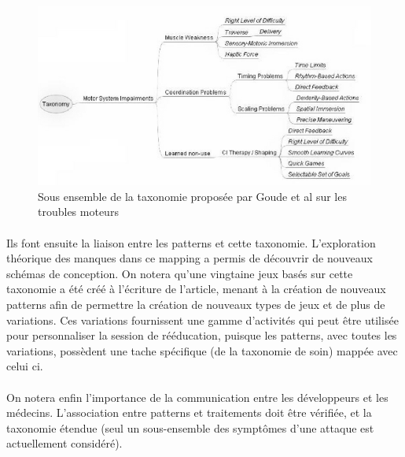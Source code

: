 \begin{figure}
	\centering
	\includegraphics[width=15cm]{images/taxonomy_conception.png}
	\caption{Sous ensemble de la taxonomie proposée par Goude et al\cite{Goud07} sur les troubles moteurs}
	\label{taxonomy_conception}
\end{figure}

\paragraph{}Ils font ensuite la liaison entre les patterns et cette taxonomie. L'exploration théorique des manques dans ce mapping a permis de découvrir de nouveaux schémas de conception. On notera qu'une vingtaine jeux basés sur cette taxonomie a été créé à l'écriture de l'article, menant à la création de nouveaux patterns afin de permettre la création de nouveaux types de jeux et de plus de variations. Ces variations fournissent une gamme d'activités qui peut être utilisée pour personnaliser la session de rééducation, puisque les patterns, avec toutes les variations, possèdent une tache spécifique (de la taxonomie de soin) mappée avec celui ci.

\paragraph{}On notera enfin l'importance de la communication entre les développeurs et les médecins. L'association entre patterns et traitements doit être vérifiée, et la taxonomie étendue (seul un sous-ensemble des symptômes d'une attaque est actuellement considéré).